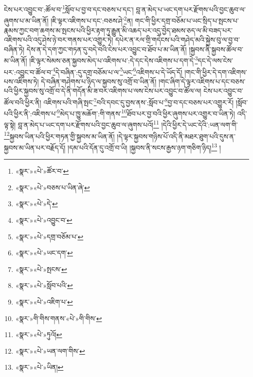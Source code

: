 ངེས་པར་འབྱུང་བ་:ཚོལ་བ་\footnote{«སྣར་»«པེ་»ཚོར་བ་}སློབ་པ་བྱ་བ་དང་བཅས་པ་དང་། བླ་ན་མེད་པ་ཡང་དག་པར་རྫོགས་པའི་བྱང་ཆུབ་ལ་ཞུགས་པ་མ་ཡིན་ནོ། །ཇི་ལྟར་འཇིགས་པ་དང་:བཅས་ཤེ་\footnote{«སྣར་»«པེ་»བཅས་པ་ཡིན་ཞེ་}ན། གང་གི་ཕྱིར་དགྲ་བཅོམ་པ་ཡང་སྲིད་པ་སྤངས་པ་རྣམས་ཀྱང་བག་ཆགས་མ་སྤངས་པའི་ཕྱིར་རྟག་ཏུ་རྒྱུན་མི་འཆད་པར་འདུ་བྱེད་ཐམས་ཅད་ལ་མི་བཟད་པར་འཇིགས་པའི་འདུ་ཤེས་ཉེ་བར་གནས་པར་འགྱུར་ཏེ། དཔེར་ན་རལ་གྲི་གདེངས་པའི་གཤེད་མའི་སྐྱེས་བུ་ལ་བྱ་བ་བཞིན་ཏེ། དེས་ན་དེ་དག་ཀྱང་གཏན་དུ་བདེ་བའི་ངེས་པར་འབྱུང་བ་ཐོབ་པ་མ་ཡིན་ནོ། །སྐྱབས་ནི་སྐྱབས་ཚོལ་བ་མ་ཡིན་ནོ། །ཇི་ལྟར་སེམས་ཅན་སྐྱབས་མེད་པ་འཇིགས་པ་:དེ་དང་དེས་འཇིགས་པ་དག་དེ་\footnote{«སྣར་»«པེ་»དེ་}དང་དེ་ལས་ངེས་པར་:འབྱུང་བ་ཚོལ་བ་\footnote{«སྣར་»«པེ་»འབྱུང་བ་}དེ་བཞིན་:དུ་དགྲ་བཅོམ་པ་ལ་\footnote{«སྣར་»«པེ་»དགྲ་བཅོམ་པ་}ཡང་\footnote{«སྣར་»«པེ་»ཡང་དག་}འཇིགས་པ་དེ་ཡོད་དོ། །གང་གི་ཕྱིར་དེ་དག་འཇིགས་པས་འཇིགས་ཏེ། དེ་བཞིན་གཤེགས་པ་ཉིད་ལ་སྐྱབས་སུ་འགྲོ་བ་ཡིན་ནོ། །གང་ཞིག་དེ་ལྟར་འཇིགས་པ་དང་བཅས་པའི་ཕྱིར་སྐྱབས་སུ་འགྲོ་བ་དེ་ནི་གདོན་མི་ཟ་བར་འཇིགས་པ་ལས་ངེས་པར་འབྱུང་བ་ཚོལ་ལ། ངེས་པར་འབྱུང་བ་ཚོལ་བའི་ཕྱིར་ནི། འཇིགས་པའི་གཞི་སྤང་\footnote{«སྣར་»«པེ་»སྤངས་}བའི་དབང་དུ་བྱས་ནས་:སློབ་པ་\footnote{«སྣར་»«པེ་»སློབ་པའི་}བྱ་བ་དང་བཅས་པར་འགྱུར་རོ། །སློབ་པའི་ཕྱིར་ནི་:འཇིགས་པ་\footnote{«སྣར་»«པེ་»འཇིག་པ་}མེད་པ་ཁྱུ་མཆོག་:གི་གནས་\footnote{«སྣར་»གི་གིས་གནས་«པེ་»གི་གིས་}ཐོབ་པར་བྱ་བའི་ཕྱིར་ཞུགས་པར་འགྱུར་བ་ཡིན་ཏེ། འདི་ལྟ་སྟེ། བླ་ན་མེད་པ་ཡང་དག་པར་རྫོགས་པའི་བྱང་ཆུབ་ལ་ཞུགས་པའོ།\footnote{«སྣར་»«པེ་»ཏུའོ།} །དེའི་ཕྱིར་དེ་ཡང་དེའི་:ཡན་ལག་གི་\footnote{«སྣར་»«པེ་»ཡན་ལག་གིས་}སྐྱབས་ཡིན་པའི་ཕྱིར་གཏན་གྱི་སྐྱབས་མ་ཡིན་ནོ། །དེ་ལྟར་སྐྱབས་གཉིས་པོ་འདི་ནི་མཐར་ཐུག་པའི་དུས་ན་སྐྱབས་མ་ཡིན་པར་བརྗོད་དོ། །དམ་པའི་དོན་དུ་འགྲོ་བ་ཡི། །སྐྱབས་ནི་སངས་རྒྱས་ཉག་གཅིག་ཉིད།\footnote{«སྣར་»«པེ་»ཡིན།} །
